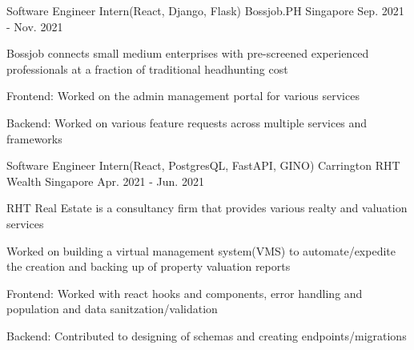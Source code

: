 

\begin{cventries}

  \cventry
    {Software Engineer Intern(React, Django, Flask)} %
    {Bossjob.PH} %
    {Singapore} %
    {Sep. 2021 - Nov. 2021} %
    {
      \begin{cvitems} %
        \item {Bossjob connects small medium enterprises with pre-screened experienced professionals at a fraction of traditional headhunting cost}
	\item {Frontend: Worked on the admin management portal for various services}
	\item {Backend: Worked on various feature requests across multiple services and frameworks}
      \end{cvitems}
    }
  \cventry
    {Software Engineer Intern(React, PostgresQL, FastAPI, GINO)} %
    {Carrington RHT Wealth} %
    {Singapore} %
    {Apr. 2021 - Jun. 2021} %
    {
      \begin{cvitems} %
      	\item {RHT Real Estate is a consultancy firm that provides various realty and valuation services}
        \item {Worked on building a virtual management system(VMS) to automate/expedite the creation and backing up of property valuation reports}
        \item {Frontend: Worked with react hooks and components,  error handling and population and data sanitzation/validation}
        \item {Backend: Contributed to designing of schemas and creating endpoints/migrations}
      \end{cvitems}
    }

\end{cventries}
